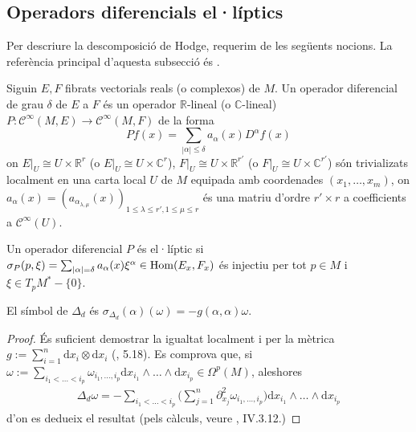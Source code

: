\subsection{Operadors diferencials el·líptics}
Per descriure la descomposició de Hodge, requerim de les següents nocions. La referència principal d'aquesta subsecció és \cite{demailly1997complex}.
\begin{definicio}
    Siguin $E,F$ fibrats vectorials reals (o complexos) de $M$. Un operador diferencial de grau $\delta$ de $E$ a $F$ és un operador $\mathbb{R}$-lineal (o $\mathbb{C}$-lineal) $P:\mathcal{C}^{\infty}(M,E)\rightarrow\mathcal{C}^{\infty}(M,F)$ de la forma
    \begin{equation*}
        Pf(x)
        =\sum_{|\alpha|\leq\delta}a_{\alpha}(x)D^{\alpha}f(x)
    \end{equation*}
    on $E|_{U}\cong U\times\mathbb{R}^{r}$ (o $E|_{U}\cong U\times\mathbb{C}^{r}$), $F|_{U}\cong U\times\mathbb{R}^{r'}$ (o $F|_{U}\cong U\times\mathbb{C}^{r'}$) són trivializats localment en una carta local $U$ de $M$ equipada amb coordenades $(x_{1},\ldots,x_{m})$, on $a_{\alpha}(x)=(a_{\alpha_{\lambda,\mu}}(x))_{1\leq\lambda\leq r',1\leq\mu\leq r}$ és una matriu d'ordre $r'\times r$ a coefficients a $\mathcal{C}^{\infty}(U)$. 
\end{definicio}
\begin{definicio}
     Un operador diferencial $P$ és el·líptic si $\sigma_{P}(p,\xi)=\sum_{|\alpha|=\delta}a_{\alpha}(x)\xi^{\alpha}\in\operatorname{Hom}(E_{x},F_{x})$ és injectiu per tot $p\in M$ i $\xi\in T_{p}M^{*}-\{0\}$.
\end{definicio}
\begin{lema}
    El símbol de $\Delta_{d}$ és $\sigma_{\Delta_{d}}(\alpha)(\omega)=-g(\alpha,\alpha)\omega$.
    \begin{proof}
        És suficient demostrar la igualtat localment i per la mètrica $g:=\sum_{i=1}^{n}\mathrm{d}x_{i}\otimes\mathrm{d}x_{i}$ (\cite{Voisin_2002}, 5.18). Es comprova que, si $\omega:=\sum_{i_{1}<\ldots<i_{p}}\omega_{i_{1},\ldots,i_{p}}\mathrm{d}x_{i_{1}}\wedge\ldots\wedge\mathrm{d}x_{i_{p}}\in\Omega^{p}(M)$, aleshores
        \begin{align*}
            \Delta_{d}\omega
            =-\sum_{i_{1}<\ldots<i_{p}}\Big(\sum_{j=1}^{n}\partial_{x_{j}}^{2}\omega_{i_{1},\ldots,i_{p}}\Big)\mathrm{d}x_{i_{1}}\wedge\ldots\wedge\mathrm{d}x_{i_{p}}
        \end{align*}
        d'on es dedueix el resultat (pels càlculs, veure \cite{demailly1997complex}, IV.3.12.)
    \end{proof}
\end{lema}
